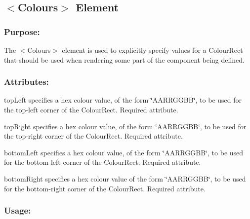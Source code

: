 \begin{DoxyCode}{0}
\end{DoxyCode}
\hypertarget{fal_element_ref_fal_elem_ref_sec_8}{}\subsection{$<$\+Colours$>$ Element}\label{fal_element_ref_fal_elem_ref_sec_8}
\hypertarget{fal_element_ref_fal_elem_ref_sec_8_1}{}\subsubsection{Purpose\+:}\label{fal_element_ref_fal_elem_ref_sec_8_1}
The {\ttfamily $<$Colours$>$} element is used to explicitly specify values for a Colour\+Rect that should be used when rendering some part of the component being defined.\hypertarget{fal_element_ref_fal_elem_ref_sec_8_2}{}\subsubsection{Attributes\+:}\label{fal_element_ref_fal_elem_ref_sec_8_2}
\begin{DoxyItemize}
\item {\ttfamily top\+Left} specifies a hex colour value, of the form \char`\"{}\+A\+A\+R\+R\+G\+G\+B\+B\char`\"{}, to be used for the top-\/left corner of the Colour\+Rect. Required attribute. \item {\ttfamily top\+Right} specifies a hex colour value, of the form \char`\"{}\+A\+A\+R\+R\+G\+G\+B\+B\char`\"{}, to be used for the top-\/right corner of the Colour\+Rect. Required attribute. \item {\ttfamily bottom\+Left} specifies a hex colour value, of the form \char`\"{}\+A\+A\+R\+R\+G\+G\+B\+B\char`\"{}, to be used for the bottom-\/left corner of the Colour\+Rect. Required attribute. \item {\ttfamily bottom\+Right} specifies a hex colour value of the form \char`\"{}\+A\+A\+R\+R\+G\+G\+B\+B\char`\"{}, to be used for the bottom-\/right corner of the Colour\+Rect. Required attribute.\end{DoxyItemize}
\hypertarget{fal_element_ref_fal_elem_ref_sec_8_3}{}\subsubsection{Usage\+:}\label{fal_element_ref_fal_elem_ref_sec_8_3}

